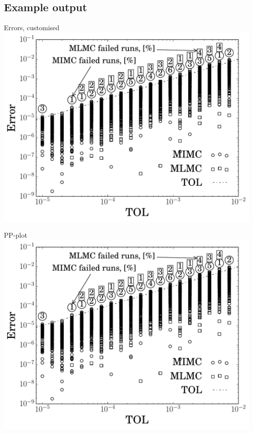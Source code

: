 \subsection{Example output}
\begin{frame}{Errors, customised}\centering
  \includegraphics[page=1, scale=0.5]{src/imgs/mckean}
\end{frame}

\begin{frame}{PP-plot}\centering
  \includegraphics[page=2, scale=0.5]{src/imgs/mckean}
\end{frame}


